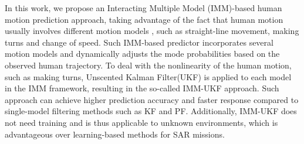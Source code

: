 \documentclass[letterpaper, 10 pt, conference]{ieeeconf}
\begin{document}
	In this work, we propose an Interacting Multiple Model (IMM)-based human motion prediction approach, taking advantage of the fact that human motion usually involves different motion models \cite{aggarwal1999human}, such as straight-line movement, making turns and change of speed.
	Such IMM-based predictor incorporates several motion models and dynamically adjusts the mode probabilities based on the observed human trajectory.
	To deal with the nonlinearity of the human motion, such as making turns, Unscented Kalman Filter(UKF) is applied to each model in the IMM framework, resulting in the so-called IMM-UKF approach.
	Such approach can achieve higher prediction accuracy and faster response compared to single-model filtering methods such as KF and PF. 
	Additionally, IMM-UKF does not need training and is thus applicable to unknown environments, which is advantageous over learning-based methods for SAR missions.
	
\end{document}
